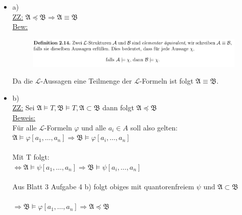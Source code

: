 \documentclass[a4paper]{scrartcl}
\begin{document}
    \begin{itemize}
        \item a)\\
            \underline{ZZ:} $\mathfrak{A} \preceq \mathfrak{B} \Rightarrow \mathfrak{A} \equiv \mathfrak{B}$\\
            \underline{Bew:}\\
               \begin{figure}[H]
                   \centering
                   \includegraphics[scale=0.25]{./El-equiv.png}
                   \label{fig:}
               \end{figure} 

               Da die $\mathscr{L}$-Aussagen eine Teilmenge der $\mathscr{L}$-Formeln ist folgt $\mathfrak{A} \equiv \mathfrak{B}$.\\

        \item b)\\
            \underline{ZZ:} Sei $\mathfrak{A} \vDash T, \mathfrak{B} \vDash T, \mathfrak{A} \subset \mathfrak{B}$ dann folgt $\mathfrak{A} \preceq \mathfrak{B}$\\
            \underline{Beweis:}\\
                Für alle $\mathscr{L}$-Formeln $\varphi$ und alle $a_i \in A$ soll also gelten:\\
                $\mathfrak{A} \vDash \varphi[a_1,\dots,a_n] \Rightarrow \mathfrak{B} \vDash \varphi[a_i,\dots,a_n]$\\
                \\Mit T folgt:\\
                $\Leftrightarrow \mathfrak{A} \vDash \psi[a_1,\dots,a_n] \Rightarrow \mathfrak{B} \vDash \psi[a_i,\dots,a_n]$\\
                \\Aus Blatt 3 Aufgabe 4 b) folgt obiges mit quantorenfreiem $\psi \text{ und } \mathfrak{A} \subset \mathfrak{B}$\\
                \\$\Rightarrow \mathfrak{B} \vDash \varphi[a_1,\dots,a_n] \Rightarrow \mathfrak{A} \preceq \mathfrak{B}$\\

    \end{itemize}
\end{document}
